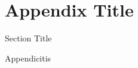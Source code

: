 \appendix

\dsp

\chapter{Appendix Title }{\label{appendix:a}}
\begin{section}{Section Title}

Appendicitis

\end{section}
